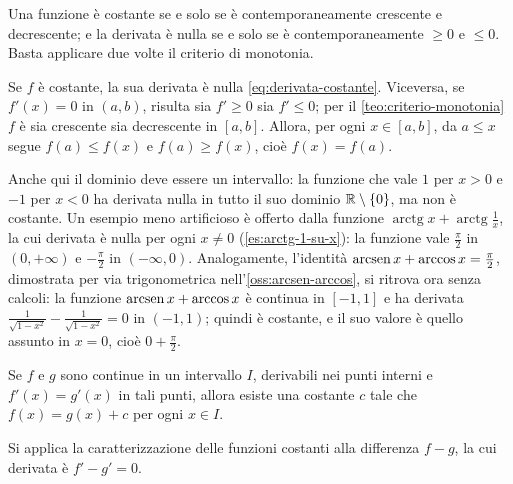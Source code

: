 \begin{strategia}
Una funzione è costante se e solo se è contemporaneamente crescente e decrescente; e la
derivata è nulla se e solo se è contemporaneamente $\ge0$ e $\le0$. Basta applicare due
volte il criterio di monotonia.
\end{strategia}

\begin{dimostrazione}
Se $f$ è costante, la sua derivata è nulla \eqref{eq:derivata-costante}. Viceversa, se
$f'(x)=0$ in $(a,b)$, risulta sia $f'\ge0$ sia $f'\le0$; per il
\cref{teo:criterio-monotonia} $f$ è sia crescente sia decrescente in $[a,b]$. Allora,
per ogni $x\in[a,b]$, da $a\le x$ segue $f(a)\le f(x)$ e $f(a)\ge f(x)$, cioè
$f(x)=f(a)$.
\end{dimostrazione}

Anche qui il dominio deve essere un intervallo: la funzione che vale $1$ per $x>0$ e
$-1$ per $x<0$ ha derivata nulla in tutto il suo dominio $\mathbb{R}\setminus\{0\}$, ma non è
costante. Un esempio meno artificioso è offerto dalla funzione
$\operatorname{arctg}x+\operatorname{arctg}\frac1x$, la cui derivata è nulla per ogni
$x\neq0$ (\cref{es:arctg-1-su-x}): la funzione vale $\frac\pi2$ in $(0,+\infty)$ e
$-\frac\pi2$ in $(-\infty,0)$. Analogamente, l'identità
$\operatorname{arcsen} x+\arccos x=\frac\pi2$, dimostrata per via trigonometrica
nell'\cref{oss:arcsen-arccos}, si ritrova ora senza calcoli: la funzione
$\operatorname{arcsen} x+\arccos x$ è continua in $[-1,1]$ e ha derivata
$\frac1{\sqrt{1-x^{2}}}-\frac1{\sqrt{1-x^{2}}}=0$ in $(-1,1)$; quindi è costante, e il
suo valore è quello assunto in $x=0$, cioè $0+\frac\pi2$.

\begin{corollario}\label{cor:stessa-derivata}
Se $f$ e $g$ sono continue in un intervallo $I$, derivabili nei punti interni e
$f'(x)=g'(x)$ in tali punti, allora esiste una costante $c$ tale che $f(x)=g(x)+c$ per
ogni $x\in I$.
\end{corollario}

\begin{schema}
\end{schema}

\begin{strategia}
Si applica la caratterizzazione delle funzioni costanti alla differenza $f-g$, la cui
derivata è $f'-g'=0$.
\end{strategia}


